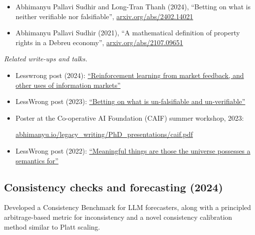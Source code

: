 \documentclass{article}
\newenvironment{relatedwork}
   {
     \begin{mdframed}[
       leftmargin=1cm,
       rightmargin=0cm,
       innerleftmargin=10pt,
       innerrightmargin=0pt,
       innertopmargin=0.5em,
       innerbottommargin=0.5em,
       linewidth=1pt,
       linecolor=gray,
       topline=false,
       bottomline=false,
       rightline=false
     ]
     \footnotesize
   }
   {
     \end{mdframed}
   }
\begin{document}
\begin{itemize}

    \item
          Abhimanyu Pallavi Sudhir and Long-Tran Thanh (2024), ``Betting on what is neither verifiable nor falsifiable'', \href{https://arxiv.org/abs/2402.14021}{arxiv.org/abs/2402.14021}

    \item
          Abhimanyu Pallavi Sudhir (2021),
          ``A mathematical definition of property rights in a Debreu economy'',
          \href{https://arxiv.org/abs/2107.09651}{arxiv.org/abs/2107.09651}

\end{itemize}

\begin{relatedwork}
    \emph{Related write-ups and talks.}
    \begin{itemize}[label=—]
        \item Lesswrong post (2024): \href{https://www.lesswrong.com/posts/Y79tkWhvHi8GgLN2q/reinforcement-learning-from-market-feedback-and-other-uses}{``Reinforcement learning from market feedback, and other uses of information markets''} 
        \item LessWrong post (2023): \href{https://www.lesswrong.com/posts/id84oe3LxdzoqinKA/betting-on-what-is-un-falsifiable-and-un-verifiable}{``Betting on what is un-falsifiable and un-verifiable''}
        \item Poster at the Co-operative AI Foundation (CAIF) summer workshop, 2023:

              \href{https://abhimanyu.io/legacy_writing/PhD_presentations/caif.pdf}{abhimanyu.io/legacy\_writing/PhD\_presentations/caif.pdf}
        \item LessWrong post (2022): \href{https://www.lesswrong.com/posts/xqxXrAohXSD3akYCg/meaningful-things-are-those-the-universe-possesses-a}{``Meaningful things are those the universe possesses a semantics for''}
    \end{itemize}
\end{relatedwork}

\subsection*{Consistency checks and forecasting (2024)}

Developed a Consistency Benchmark for LLM forecasters, along with a principled arbitrage-based metric for inconsistency and a novel consistency calibration method similar to Platt scaling.
\end{document}
